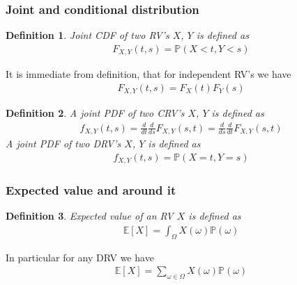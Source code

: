 \documentclass[10pt]{article}
\newtheorem*{definition}{Definition}
\begin{document}
\subsubsection{Joint and conditional distribution}

\begin{definition} Joint CDF of two RV's $X$, $Y$ is defined as
    \begin{align}
        F_{X,Y}(t,s)=\mathbb{P}(X<t,Y<s)
    \end{align}
\end{definition}
It is immediate from definition, that for independent RV's we have
\begin{align}
    F_{X,Y}(t,s)=F_X(t)F_Y(s)
\end{align}

\begin{definition} A joint PDF of two CRV's $X$, $Y$ is defined as
    \begin{align}
        f_{X,Y}(t,s)
        =\frac{d}{dt}\frac{d}{ds}F_{X,Y}(s,t)
        =\frac{d}{ds}\frac{d}{dt}F_{X,Y}(s,t)
    \end{align}
    A joint PDF of two DRV's $X$, $Y$ is defined as
    \begin{align}
        f_{X,Y}(t,s)=\mathbb{P}(X=t,Y=s)
    \end{align}
\end{definition}


\subsubsection{Expected value and around it}

\begin{definition} Expected value of an RV $X$ is defined as
    \begin{align}
        \mathbb{E}[X]=\int_{\Omega} X(\omega)\mathbb{P}(\omega)
    \end{align}
\end{definition}

In particular for any DRV we have
\begin{align}
    \mathbb{E}[X]=\sum_{\omega\in\Omega}X(\omega)\mathbb{P}(\omega)
\end{align}
\end{document}
